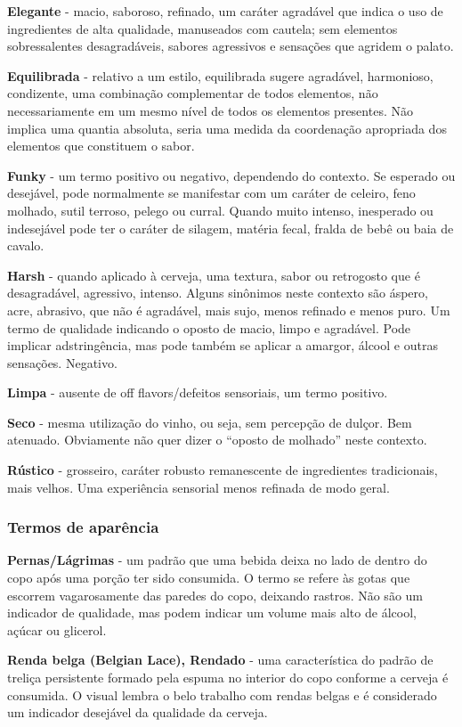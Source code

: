\textbf{Elegante} - macio, saboroso, refinado, um caráter agradável que indica o uso de ingredientes de alta qualidade, manuseados com cautela; sem elementos sobressalentes desagradáveis, sabores agressivos e sensações que agridem o palato.

\textbf{Equilibrada} - relativo a um estilo, equilibrada sugere agradável, harmonioso, condizente, uma combinação complementar de todos elementos, não necessariamente em um mesmo nível de todos os elementos presentes. Não implica uma quantia absoluta, seria uma medida da coordenação apropriada dos elementos que constituem o sabor.

\textbf{Funky} - um termo positivo ou negativo, dependendo do contexto. Se esperado ou desejável, pode normalmente se manifestar com um caráter de celeiro, feno molhado, sutil terroso, pelego ou curral. Quando muito intenso, inesperado ou indesejável pode ter o caráter de silagem, matéria fecal, fralda de bebê ou baia de cavalo.

\textbf{Harsh} - quando aplicado à cerveja, uma textura, sabor ou retrogosto que é desagradável, agressivo, intenso. Alguns sinônimos neste contexto são áspero, acre, abrasivo, que não é agradável, mais sujo, menos refinado e menos puro. Um termo de qualidade indicando o oposto de macio, limpo e agradável. Pode implicar adstringência, mas pode também se aplicar a amargor, álcool e outras sensações. Negativo.

\textbf{Limpa} - ausente de off flavors/defeitos sensoriais, um termo positivo.

\textbf{Seco} - mesma utilização do vinho, ou seja, sem percepção de dulçor. Bem atenuado. Obviamente não quer dizer o “oposto de molhado” neste contexto.

\textbf{Rústico} - grosseiro, caráter robusto remanescente de ingredientes tradicionais, mais velhos. Uma experiência sensorial menos refinada de modo geral.

\subsubsection*{Termos de aparência}
\textbf{Pernas/Lágrimas} - um padrão que uma bebida deixa no lado de dentro do copo após uma porção ter sido consumida. O termo se refere às gotas que escorrem vagarosamente das paredes do copo, deixando rastros. Não são um indicador de qualidade, mas podem indicar um volume mais alto de álcool, açúcar ou glicerol.

\textbf{Renda belga (Belgian Lace), Rendado} - uma característica do padrão de treliça persistente formado pela espuma no interior do copo conforme a cerveja é consumida. O visual lembra o belo trabalho com rendas belgas e é considerado um indicador desejável da qualidade da cerveja.
